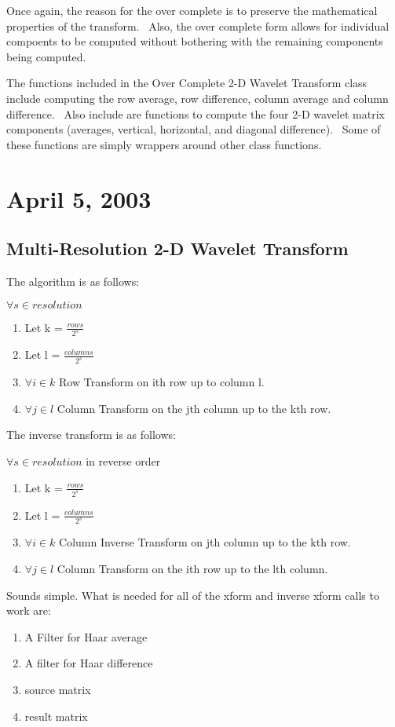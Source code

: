 \documentclass{article}
\begin{document}
\bigskip Once again, the reason for the over complete is to preserve the
mathematical properties of the transform. \ Also, the over complete form
allows for individual compoents to be computed without bothering with the
remaining components being computed. \ 

The functions included in the Over Complete 2-D Wavelet Transform class
include computing the row average, row difference, column average and column
difference. \ Also include are functions to compute the four 2-D wavelet
matrix components (averages, vertical, horizontal, and diagonal difference).
\ Some of these functions are simply wrappers around other class functions.
\ 

\section{April 5, 2003}
\subsection{Multi-Resolution 2-D Wavelet Transform}
The algorithm is as follows:

$\forall s \in resolution $
\begin {enumerate}
\item Let k = $\frac{rows}{2^s}$
\item Let l = $\frac{columns}{2^s}$
\item $\forall i \in k $ Row Transform on ith row up to column l.
\item $\forall j \in l $ Column Transform on the jth column up to the kth row.
\end {enumerate}

The inverse transform is as follows:

$\forall s \in resolution $ in reverse order
\begin {enumerate}
\item Let k = $\frac{rows}{2^s}$
\item Let l = $\frac{columns}{2^s}$
\item $\forall i \in k $ Column Inverse Transform on jth column up to the kth row.
\item $\forall j \in l $ Column Transform on the ith row up to the lth column.
\end {enumerate}

Sounds simple.  What is needed for all of the xform and inverse xform calls to work are:
\begin{enumerate}
\item A Filter for Haar average
\item A filter for Haar difference
\item source matrix
\item result matrix
\end{enumerate}
\end{document}
